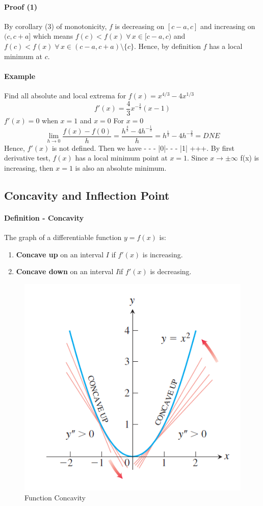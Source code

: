 \documentclass[12pt]{article}
\begin{document}
\paragraph{Proof (1)}
By corollary (3) of monotonicity, $f$ is decreasing on $[c - a, c]$ and increasing on 
$(c, c + a]$ which means $f(c) < f(x) \; \forall \, x \in [c - a, c)$ and $f(c) < f(x) \; \forall
\, x \in (c - a, c + a) \setminus\{c\}$. Hence, by definition $f$ has a local minimum at $c$.

\paragraph{Example}
Find all absolute and local extrema for $f(x) = x^{4/3} - 4x^{1/3}$
\[
    f'(x) = \frac{4}{3}x^{ - \frac{2}{3}}(x - 1)
\]
$f'(x) = 0$ when $x = 1$ and $x = 0$
For $x = 0$
\[
    \lim_{h \to 0} \frac{f(x) - f(0)}{h} = \frac{h^{\frac{4}{3}} - 4h^{ - \frac{1}{3}}}{h} = h^{\frac{1}{3}} - 4h^{ - \frac{2}{3}} = DNE 
\]
Hence, $f'(x)$ is not defined.
Then we have - - - |0|- - - |1| +++. By first derivative test, $f(x)$ has a local minimum point at $x = 1$. Since $x \to \pm \infty$ f(x) is increasing,
then $x = 1$ is also an absolute minimum.
\subsection{Concavity and Inflection Point}
\paragraph{Definition - Concavity}
The graph of a differentiable function $y = f(x)$ is:
\begin{enumerate} 
     \item \textbf{Concave up} on an interval $I$ if $f'(x)$ is increasing.
     \item \textbf{Concave down} on an interval $I$if $f'(x)$ is decreasing.
\end{enumerate}
\begin{figure}[h!]
     \centering
     \includegraphics[width = 0.4\linewidth]{Images/concavity.png}
     \caption{Function Concavity}
\end{figure}
\end{document}
